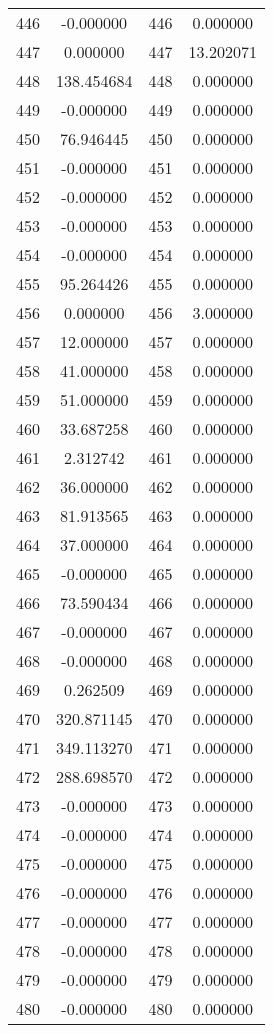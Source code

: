 \documentclass[12pt]{article}
\begin{document}
\begin{longtable}{@{}cccc@{}}
446 & -0.000000 & 446 & 0.000000 \\
447 & 0.000000 & 447 & 13.202071 \\
448 & 138.454684 & 448 & 0.000000 \\
449 & -0.000000 & 449 & 0.000000 \\
450 & 76.946445 & 450 & 0.000000 \\
451 & -0.000000 & 451 & 0.000000 \\
452 & -0.000000 & 452 & 0.000000 \\
453 & -0.000000 & 453 & 0.000000 \\
454 & -0.000000 & 454 & 0.000000 \\
455 & 95.264426 & 455 & 0.000000 \\
456 & 0.000000 & 456 & 3.000000 \\
457 & 12.000000 & 457 & 0.000000 \\
458 & 41.000000 & 458 & 0.000000 \\
459 & 51.000000 & 459 & 0.000000 \\
460 & 33.687258 & 460 & 0.000000 \\
461 & 2.312742 & 461 & 0.000000 \\
462 & 36.000000 & 462 & 0.000000 \\
463 & 81.913565 & 463 & 0.000000 \\
464 & 37.000000 & 464 & 0.000000 \\
465 & -0.000000 & 465 & 0.000000 \\
466 & 73.590434 & 466 & 0.000000 \\
467 & -0.000000 & 467 & 0.000000 \\
468 & -0.000000 & 468 & 0.000000 \\
469 & 0.262509 & 469 & 0.000000 \\
470 & 320.871145 & 470 & 0.000000 \\
471 & 349.113270 & 471 & 0.000000 \\
472 & 288.698570 & 472 & 0.000000 \\
473 & -0.000000 & 473 & 0.000000 \\
474 & -0.000000 & 474 & 0.000000 \\
475 & -0.000000 & 475 & 0.000000 \\
476 & -0.000000 & 476 & 0.000000 \\
477 & -0.000000 & 477 & 0.000000 \\
478 & -0.000000 & 478 & 0.000000 \\
479 & -0.000000 & 479 & 0.000000 \\
480 & -0.000000 & 480 & 0.000000 \\

\end{longtable}
\end{document}
